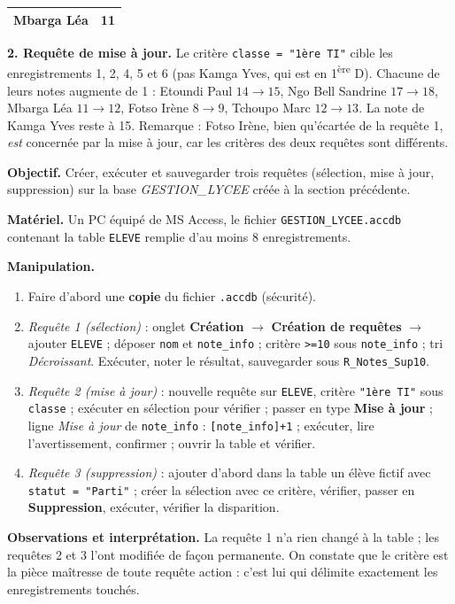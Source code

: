 \documentclass[11pt]{article}
\begin{document}
\begin{exoresolu}
\begin{center}
\begin{tabularx}{0.7\linewidth}{|X|c|}
\hline
Mbarga Léa & 11 \\
\hline
\end{tabularx}
\end{center}
\textbf{2. Requête de mise à jour.} Le critère \texttt{classe = "1ère TI"} cible les enregistrements 1, 2, 4, 5 et 6 (pas Kamga Yves, qui est en 1\textsuperscript{ère} D). Chacune de leurs notes augmente de 1 : Etoundi Paul $14 \to 15$, Ngo Bell Sandrine $17 \to 18$, Mbarga Léa $11 \to 12$, Fotso Irène $8 \to 9$, Tchoupo Marc $12 \to 13$. La note de Kamga Yves reste à 15. Remarque : Fotso Irène, bien qu'écartée de la requête 1, \emph{est} concernée par la mise à jour, car les critères des deux requêtes sont différents.
\end{exoresolu}

\begin{experience}
\textbf{Objectif.} Créer, exécuter et sauvegarder trois requêtes (sélection, mise à jour, suppression) sur la base \emph{GESTION\_LYCEE} créée à la section précédente.\par
\textbf{Matériel.} Un PC équipé de MS Access, le fichier \texttt{GESTION\_LYCEE.accdb} contenant la table \texttt{ELEVE} remplie d'au moins 8 enregistrements.\par
\textbf{Manipulation.}
\begin{enumerate}
\item Faire d'abord une \textbf{copie} du fichier \texttt{.accdb} (sécurité).
\item \emph{Requête 1 (sélection)} : onglet \textbf{Création} $\to$ \textbf{Création de requêtes} $\to$ ajouter \texttt{ELEVE} ; déposer \texttt{nom} et \texttt{note\_info} ; critère \texttt{>=10} sous \texttt{note\_info} ; tri \emph{Décroissant}. Exécuter, noter le résultat, sauvegarder sous \texttt{R\_Notes\_Sup10}.
\item \emph{Requête 2 (mise à jour)} : nouvelle requête sur \texttt{ELEVE}, critère \texttt{"1ère TI"} sous \texttt{classe} ; exécuter en sélection pour vérifier ; passer en type \textbf{Mise à jour} ; ligne \emph{Mise à jour} de \texttt{note\_info} : \texttt{[note\_info]+1} ; exécuter, lire l'avertissement, confirmer ; ouvrir la table et vérifier.
\item \emph{Requête 3 (suppression)} : ajouter d'abord dans la table un élève fictif avec \texttt{statut = "Parti"} ; créer la sélection avec ce critère, vérifier, passer en \textbf{Suppression}, exécuter, vérifier la disparition.
\end{enumerate}
\textbf{Observations et interprétation.} La requête 1 n'a rien changé à la table ; les requêtes 2 et 3 l'ont modifiée de façon permanente. On constate que le critère est la pièce maîtresse de toute requête action : c'est lui qui délimite exactement les enregistrements touchés.
\end{experience}
\end{document}
